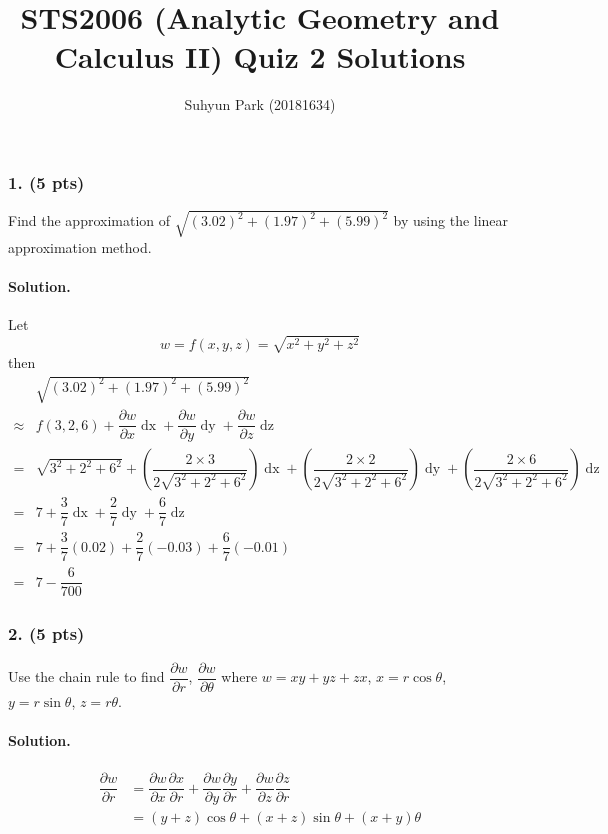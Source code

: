 
	


\title{STS2006 (Analytic Geometry and Calculus II) \newline Quiz 2 Solutions}
\author{Suhyun Park (20181634)}
\maketitle

\subsubsection{1. (5 pts)} Find the approximation of $\sqrt{\left(3.02\right)^2+\left(1.97\right)^2+\left(5.99\right)^2}$ by using the linear approximation method.

\paragraph{Solution.} Let \[w = f\left(x, y, z\right) = \sqrt{x^2+y^2+z^2}\]
then
\begin{align*}
	&\sqrt{\left(3.02\right)^2+\left(1.97\right)^2+\left(5.99\right)^2}\\
	\approx & f\left(3, 2, 6\right)
		+\dfrac{\partial w}{\partial x}\mathop{dx}
		+\dfrac{\partial w}{\partial y}\mathop{dy}
		+\dfrac{\partial w}{\partial z}\mathop{dz}\\
	=&\sqrt{3^2+2^2+6^2}
		+\left(\dfrac{2\times3}{2\sqrt{3^2+2^2+6^2}}\right)\mathop{dx}
		+\left(\dfrac{2\times2}{2\sqrt{3^2+2^2+6^2}}\right)\mathop{dy}
		+\left(\dfrac{2\times6}{2\sqrt{3^2+2^2+6^2}}\right)\mathop{dz}\\
	=&7+\dfrac{3}{7}\mathop{dx}+\dfrac{2}{7}\mathop{dy}+\dfrac{6}{7}\mathop{dz}\\
	=&7+\dfrac{3}{7}\left(0.02\right)+\dfrac{2}{7}\left(-0.03\right)+\dfrac{6}{7}\left(-0.01\right)\\
	=&7-\dfrac{6}{700}
\end{align*}
\par

\subsubsection{2. (5 pts)} Use the chain rule to find $\dfrac{\partial w}{\partial r}$, $\dfrac{\partial w}{\partial \theta}$ where $w=xy+yz+zx$, $x=r\cos\theta$, $y=r\sin\theta$, $z=r\theta$.

\paragraph{Solution.}
\begin{align*}
	\dfrac{\partial w}{\partial r}
	&= \dfrac{\partial w}{\partial x}\dfrac{\partial x}{\partial r}
		 + \dfrac{\partial w}{\partial y}\dfrac{\partial y}{\partial r}
		 + \dfrac{\partial w}{\partial z}\dfrac{\partial z}{\partial r}\\
	&= \left(y+z\right)\cos\theta+\left(x+z\right)\sin\theta+\left(x+y\right)\theta
\end{align*}

